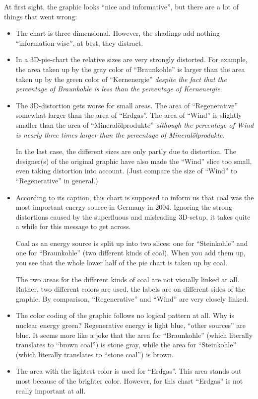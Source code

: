 At first sight, the graphic looks ``nice and informative'', but there are a lot
of things that went wrong:
%
\begin{itemize}
    \item The chart is three dimensional. However, the shadings add nothing
        ``information-wise'', at best, they distract.
    \item In a 3D-pie-chart the relative sizes are very strongly distorted.
        For example, the area taken up by the gray color of ``Braunkohle'' is
        larger than the area taken up by the green color of ``Kernenergie''
        \emph{despite the fact that the percentage of Braunkohle is less than
        the percentage of Kernenergie}.
    \item The 3D-distortion gets worse for small areas. The area of
        ``Regenerative'' somewhat larger than the area of ``Erdgas''. The
        area of ``Wind'' is slightly smaller than the area of
        ``Mineral\"olprodukte'' \emph{although the percentage of Wind is
        nearly three times larger than the percentage of
        Mineral\"olprodukte.}

        In the last case, the different sizes are only partly due to
        distortion. The designer(s) of the original graphic have also made
        the ``Wind'' slice too small, even taking distortion into
        account. (Just compare the size of ``Wind'' to ``Regenerative'' in
        general.)
    \item According to its caption, this chart is supposed to inform us that
        coal was the most important energy source in Germany in 2004.
        Ignoring the strong distortions caused by the superfluous and
        misleading 3D-setup, it takes quite a while for this message to get
        across.

        Coal as an energy source is split up into two slices: one for
        ``Steinkohle'' and one for ``Braunkohle'' (two different kinds of
        coal). When you add them up, you see that the whole lower half of
        the pie chart is taken up by coal.

        The two areas for the different kinds of coal are not visually
        linked at all. Rather, two different colors are used, the labels are
        on different sides of the graphic. By comparison, ``Regenerative''
        and ``Wind'' are very closely linked.
    \item The color coding of the graphic follows no logical pattern at all.
        Why is nuclear energy green? Regenerative energy is light blue,
        ``other sources'' are blue. It seems more like a joke that the area
        for ``Braunkohle'' (which literally translates to ``brown coal'') is
        stone gray, while the area for ``Steinkohle'' (which literally
        translates to ``stone coal'') is brown.
    \item The area with the lightest color is used for ``Erdgas''. This area
        stands out most because of the brighter color. However, for this
        chart ``Erdgas'' is not really important at all.
\end{itemize}
